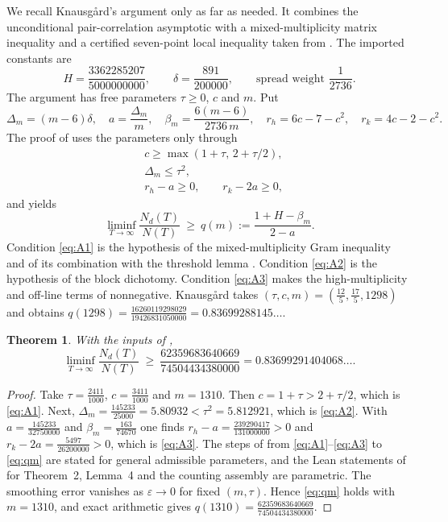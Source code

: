 \documentclass[reqno,11pt]{amsart}
\numberwithin{equation}{section}
\theoremstyle{plain}
\newtheorem{theorem}{Theorem}[section]
\theoremstyle{remark}
\newcommand{\eps}{\varepsilon}
\begin{document}
We recall Knausg{\aa}rd's argument \cite{Kna26} only as far as needed. It
combines the unconditional pair-correlation asymptotic \cite{BGST24} with a
mixed-multiplicity matrix inequality and a certified seven-point local
inequality taken from \cite{TRM26}. The imported constants are
\begin{equation}\label{eq:imports}
H=\frac{3362285207}{5000000000},\qquad \delta=\frac{891}{200000},\qquad
\text{spread weight }\frac1{2736}.
\end{equation}
The argument has free parameters $\tau\ge0$, $c$ and $m$. Put
\[
\Delta_m=(m-6)\delta,\quad a=\frac{\Delta_m}{m},\quad
\beta_m=\frac{6(m-6)}{2736\,m},\quad r_h=6c-7-c^2,\quad r_k=4c-2-c^2 .
\]
The proof of \cite[Theorem~1]{Kna26} uses the parameters only through
\begin{align}
&c\ge\max(1+\tau,\,2+\tau/2), \label{eq:A1}\\
&\Delta_m\le\tau^2, \label{eq:A2}\\
&r_h-a\ge0,\qquad r_k-2a\ge0, \label{eq:A3}
\end{align}
and yields
\begin{equation}\label{eq:qm}
\liminf_{T\to\infty}\frac{N_d(T)}{N(T)}\ \ge\ q(m):=\frac{1+H-\beta_m}{2-a}.
\end{equation}
Condition \eqref{eq:A1} is the hypothesis of the mixed-multiplicity Gram
inequality \cite[Thm.~2]{Kna26} and of its combination with the threshold
lemma \cite[Lem.~4]{Kna26}. Condition \eqref{eq:A2} is the hypothesis of the
block dichotomy. Condition \eqref{eq:A3} makes the high-multiplicity and
off-line terms of \cite[(1)--(2)]{Kna26} nonnegative. Knausg{\aa}rd takes
$(\tau,c,m)=(\frac{12}5,\frac{17}5,1298)$ and obtains
$q(1298)=\frac{16260119298029}{19426831050000}=0.83699288145\ldots$.

\begin{theorem}\label{thm:distinct}
With the inputs of \cite{Kna26},
\[
\liminf_{T\to\infty}\frac{N_d(T)}{N(T)}\ \ge\
\frac{62359683640669}{74504434380000}=0.83699291404068\ldots .
\]
\end{theorem}

\begin{proof}
Take $\tau=\frac{2411}{1000}$, $c=\frac{3411}{1000}$ and $m=1310$. Then
$c=1+\tau>2+\tau/2$, which is \eqref{eq:A1}. Next,
$\Delta_m=\frac{145233}{25000}=5.80932<\tau^2=5.812921$, which is
\eqref{eq:A2}. With $a=\frac{145233}{32750000}$ and
$\beta_m=\frac{163}{74670}$ one finds
$r_h-a=\frac{239290417}{131000000}>0$ and $r_k-2a=\frac{5497}{26200000}>0$,
which is \eqref{eq:A3}. The steps of \cite{Kna26} from
\eqref{eq:A1}--\eqref{eq:A3} to \eqref{eq:qm} are stated for general admissible
parameters, and the Lean statements of \cite[\S4]{Kna26} for Theorem~2, Lemma~4
and the counting assembly are parametric. The smoothing error vanishes as
$\eps\to0$ for fixed $(m,\tau)$. Hence \eqref{eq:qm} holds with $m=1310$, and
exact arithmetic gives $q(1310)=\frac{62359683640669}{74504434380000}$.
\end{proof}
\end{document}
